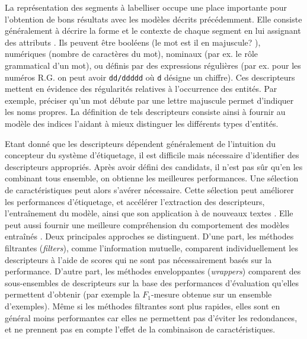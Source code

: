 La représentation des segments à labelliser occupe une place importante pour l'obtention de bons résultats avec les modèles décrits précédemment. Elle consiste généralement à décrire la forme et le contexte de chaque segment en lui assignant des attributs \citep{nadeau2007nersurvey,sharnagat2014nersurvey}. Ils peuvent être booléens (\og le mot est il en majuscule? \fg{}), numériques (nombre de caractères du mot), nominaux (par ex. le rôle grammatical d'un mot), ou définis par des expressions régulières (par ex. pour les numéros R.G. on peut avoir \verb|dd/ddddd| où \verb|d| désigne un chiffre). Ces descripteurs mettent  en évidence des régularités relatives à l'occurrence des entités. Par exemple, préciser qu'un mot débute par une lettre majuscule permet d'indiquer les noms propres. La définition de tels descripteurs consiste ainsi à fournir au modèle des indices l'aidant à mieux distinguer les différents types d'entités. 

Etant donné que les descripteurs dépendent généralement de l'intuition du concepteur du système d'étiquetage, il est difficile mais nécessaire d'identifier des descripteurs appropriés. Après avoir défini des candidats, il n'est pas sûr qu'en les combinant tous ensemble, on obtienne les meilleures performances. Une sélection de caractéristiques peut alors s'avérer nécessaire. Cette sélection peut améliorer les performances d'étiquetage, et accélérer l'extraction des descripteurs, l'entraînement du modèle, ainsi que son application à de nouveaux textes \citep{kitoogo2007featureSelectNER}. Elle peut aussi fournir une meilleure compréhension du comportement des modèles entraînés \citep{klinger2009FeaturefilterCRF}. Deux principales approches se distinguent. D'une part, les méthodes \og filtrantes \fg{} (\textit{filters}), comme l'information mutuelle, comparent individuellement les descripteurs à l'aide de scores qui ne sont pas nécessairement basés sur la performance. D'autre part, les méthodes \og enveloppantes \fg{} (\textit{wrappers}) comparent des sous-ensembles de descripteurs sur la base des performances d'évaluation qu'elles permettent d'obtenir (par exemple la $F_1$-mesure obtenue sur un ensemble d'exemples). Même si les méthodes filtrantes sont plus rapides, elles sont en général moins performantes car elles ne permettent pas d'éviter les redondances, et ne prennent pas en compte l'effet de la combinaison de caractéristiques.

